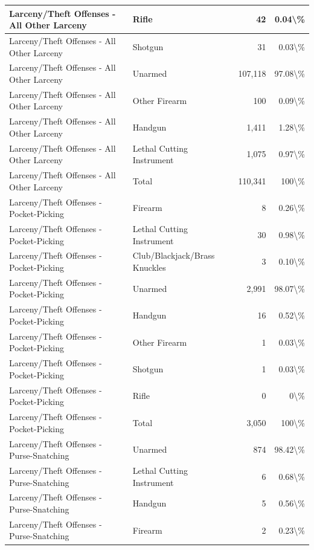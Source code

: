 \documentclass[
]{krantz}
\begin{document}
\begin{longtable}[t]{l|l|r|r}
\hline
Larceny/Theft Offenses - All Other Larceny & Rifle & 42 & 0.04\textbackslash{}\%\\
\hline
Larceny/Theft Offenses - All Other Larceny & Shotgun & 31 & 0.03\textbackslash{}\%\\
\hline
Larceny/Theft Offenses - All Other Larceny & Unarmed & 107,118 & 97.08\textbackslash{}\%\\
\hline
Larceny/Theft Offenses - All Other Larceny & Other Firearm & 100 & 0.09\textbackslash{}\%\\
\hline
Larceny/Theft Offenses - All Other Larceny & Handgun & 1,411 & 1.28\textbackslash{}\%\\
\hline
Larceny/Theft Offenses - All Other Larceny & Lethal Cutting Instrument & 1,075 & 0.97\textbackslash{}\%\\
\hline
Larceny/Theft Offenses - All Other Larceny & Total & 110,341 & 100\textbackslash{}\%\\
\hline
Larceny/Theft Offenses - Pocket-Picking & Firearm & 8 & 0.26\textbackslash{}\%\\
\hline
Larceny/Theft Offenses - Pocket-Picking & Lethal Cutting Instrument & 30 & 0.98\textbackslash{}\%\\
\hline
Larceny/Theft Offenses - Pocket-Picking & Club/Blackjack/Brass Knuckles & 3 & 0.10\textbackslash{}\%\\
\hline
Larceny/Theft Offenses - Pocket-Picking & Unarmed & 2,991 & 98.07\textbackslash{}\%\\
\hline
Larceny/Theft Offenses - Pocket-Picking & Handgun & 16 & 0.52\textbackslash{}\%\\
\hline
Larceny/Theft Offenses - Pocket-Picking & Other Firearm & 1 & 0.03\textbackslash{}\%\\
\hline
Larceny/Theft Offenses - Pocket-Picking & Shotgun & 1 & 0.03\textbackslash{}\%\\
\hline
Larceny/Theft Offenses - Pocket-Picking & Rifle & 0 & 0\textbackslash{}\%\\
\hline
Larceny/Theft Offenses - Pocket-Picking & Total & 3,050 & 100\textbackslash{}\%\\
\hline
Larceny/Theft Offenses - Purse-Snatching & Unarmed & 874 & 98.42\textbackslash{}\%\\
\hline
Larceny/Theft Offenses - Purse-Snatching & Lethal Cutting Instrument & 6 & 0.68\textbackslash{}\%\\
\hline
Larceny/Theft Offenses - Purse-Snatching & Handgun & 5 & 0.56\textbackslash{}\%\\
\hline
Larceny/Theft Offenses - Purse-Snatching & Firearm & 2 & 0.23\textbackslash{}\%\\

\end{longtable}
\end{document}
